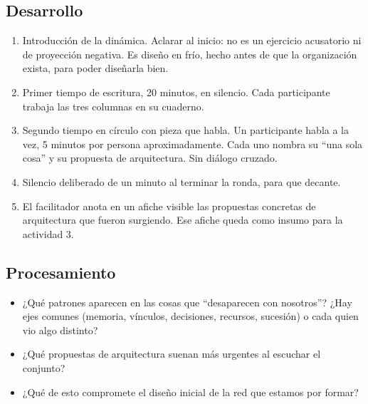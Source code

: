 \documentclass[11pt, a4paper]{article}
\begin{document}
\begin{actividad}
\subsection*{Desarrollo}
\begin{enumerate}[label={\arabic*.}]
  \item Introducción de la dinámica. Aclarar al inicio: no es un ejercicio acusatorio ni de proyección negativa. Es diseño en frío, hecho antes de que la organización exista, para poder diseñarla bien.
  \item Primer tiempo de escritura, 20 minutos, en silencio. Cada participante trabaja las tres columnas en su cuaderno.
  \item Segundo tiempo en círculo con pieza que habla. Un participante habla a la vez, 5 minutos por persona aproximadamente. Cada uno nombra su ``una sola cosa'' y su propuesta de arquitectura. Sin diálogo cruzado.
  \item Silencio deliberado de un minuto al terminar la ronda, para que decante.
  \item El facilitador anota en un afiche visible las propuestas concretas de arquitectura que fueron surgiendo. Ese afiche queda como insumo para la actividad 3.
\end{enumerate}

\subsection*{Procesamiento}
\begin{itemize}
  \item ¿Qué patrones aparecen en las cosas que ``desaparecen con nosotros''? ¿Hay ejes comunes (memoria, vínculos, decisiones, recursos, sucesión) o cada quien vio algo distinto?
  \item ¿Qué propuestas de arquitectura suenan más urgentes al escuchar el conjunto?
  \item ¿Qué de esto compromete el diseño inicial de la red que estamos por formar?
\end{itemize}


\end{actividad}
\end{document}
